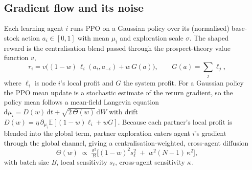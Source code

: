 \documentclass[letterpaper]{article}
\theoremstyle{plain}
\begin{document}
\subsection{Gradient flow and its noise}
Each learning agent $i$ runs PPO on a Gaussian policy over its (normalised)
base-stock action $a_i\in[0,1]$ with mean $\mu_i$ and exploration scale
$\sigma$. The shaped reward is the centralisation blend passed through the
prospect-theory value function $v$,
\begin{equation}
  r_i = v\!\big((1-w)\,\ell_i(a_i,a_{-i}) + w\,G(a)\big),
  \qquad G(a)=\textstyle\sum_j \ell_j ,
  \label{eq:blend}
\end{equation}
where $\ell_i$ is node $i$'s local profit and $G$ the system profit. For a
Gaussian policy the PPO mean update is a stochastic estimate of the return
gradient, so the policy mean follows a mean-field Langevin equation
$\mathrm{d}\mu_i = D(w)\,\mathrm{d}t + \sqrt{2\,\Theta(w)}\,\mathrm{d}W$ with drift
$D(w)=\eta\,\partial_{\mu_i}\mathbb{E}[(1{-}w)\ell_i+wG]$. Because each partner's
local profit is blended into the global term, partner exploration enters agent
$i$'s gradient through the global channel, giving a centralisation-weighted,
cross-agent diffusion
\begin{equation}
  \Theta(w)\;\propto\;\tfrac{\sigma^2}{B}\big[(1{-}w)^2 s_\ell^2 \;+\; w^2 (N{-}1)\,\kappa^2\big],
  \label{eq:diffusion}
\end{equation}
with batch size $B$, local sensitivity $s_\ell$, cross-agent sensitivity $\kappa$.
\end{document}
